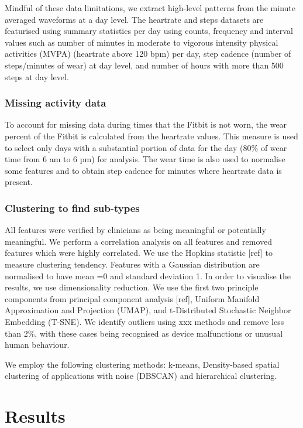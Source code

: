 \documentclass{article}
\begin{document}
Mindful of these data limitations, we extract high-level patterns from the minute averaged waveforms at a day level. The heartrate and steps datasets are featurised using summary statistics per day using counts, frequency and interval values such as number of minutes in moderate to vigorous intensity physical activities (MVPA) (heartrate above 120 bpm) per day, step cadence (number of steps/minutes of wear) at day level, and number of hours with more than 500 steps at day level. 


\subsubsection{Missing activity data}

To account for missing data during times that the Fitbit is not worn, the wear percent of the Fitbit is calculated from the heartrate values. This measure is used to select only days with a substantial portion of data for the day (80\% of wear time from 6 am to 6 pm) for analysis. The wear time is also used to normalise some features and to obtain step cadence for minutes where heartrate data is present. 

\subsubsection{Clustering to find sub-types}  

All features were verified by clinicians as being meaningful or potentially meaningful. We perform a correlation analysis on all features and removed features which were highly correlated. We use the Hopkins statistic [ref] to measure clustering tendency. Features with a Gaussian distribution are normalised to have mean =0 and standard deviation 1. In order to visualise the results, we use dimensionality reduction. We use the first two principle components from principal component analysis [ref], Uniform Manifold Approximation and Projection (UMAP), and t-Distributed Stochastic Neighbor Embedding (T-SNE). We identify outliers using xxx methods and remove less than 2\%, with these cases being recognised as device malfunctions or unusual human behaviour.  

We employ the following clustering methods: k-means, Density-based spatial clustering of applications with noise (DBSCAN) and hierarchical clustering.  

\section{Results}
\end{document}
